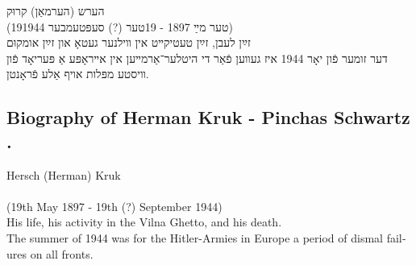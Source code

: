 \documentclass{article}
\begin{document}
\begin{pairs}

\begin{Rightside}

\begin{RTL}
\begin{hebrew}
\beginnumbering

\autopar

הערש (הערמאַן) קרוּק\\  (19טער מײַ 1897 - 19טער (?) סעפּטעמבער 1944)\\

זײַן לעבן, זײַן טעטיקײט אין װילנער געטאָ און זײַן אומקוּם\\ 

דער זומער פֿון יאָר 1944 איז געװען פֿאַר די היטלער־אַרמײען אין אײראָפּע
אַ פּעריאָד פֿון װיסטע מפּלות אויף אַלע פֿראָנטן.

\endnumbering
\end{hebrew}
\end{RTL}
\end{Rightside}


\begin{Leftside}
\begin{english}
\section{
Biography of Herman Kruk - Pinchas Schwartz \\  .  }
\beginnumbering
\autopar

Hersch (Herman) Kruk \\ \\ (19th May 1897 - 19th (?) September 1944) \\ 

His life, his activity in the Vilna Ghetto, and his death. \\

The summer of 1944 was for the Hitler-Armies in Europe a period
of dismal failures on all fronts.

\endnumbering
\end{english}
\end{Leftside}

\end{pairs}
\Columns
\end{document}

